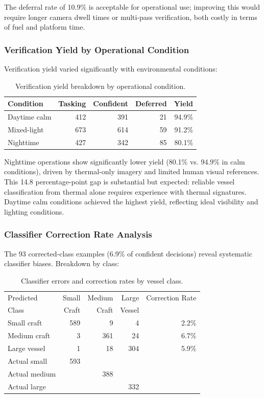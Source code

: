\documentclass[conf]{asmeconf}
\begin{document}
The deferral rate of 10.9\% is acceptable for operational use; improving this would require longer camera dwell times or multi-pass verification, both costly in terms of fuel and platform time.

\subsubsection{Verification Yield by Operational Condition}

Verification yield varied significantly with environmental conditions:

\begin{table}[t]
\caption{Verification yield breakdown by operational condition.}
\label{tab:yield_by_condition}
\centering
\begin{tabular}{@{}lrrrr@{}}
\toprule
Condition & Tasking & Confident & Deferred & Yield \\
\midrule
Daytime calm & 412 & 391 & 21 & 94.9\% \\
Mixed-light & 673 & 614 & 59 & 91.2\% \\
Nighttime & 427 & 342 & 85 & 80.1\% \\
\bottomrule
\end{tabular}
\end{table}

Nighttime operations show significantly lower yield (80.1\% vs. 94.9\% in calm conditions), driven by thermal-only imagery and limited human visual references. This 14.8 percentage-point gap is substantial but expected: reliable vessel classification from thermal alone requires experience with thermal signatures. Daytime calm conditions achieved the highest yield, reflecting ideal visibility and lighting conditions.

\subsubsection{Classifier Correction Rate Analysis}

The 93 corrected-class examples (6.9\% of confident decisions) reveal systematic classifier biases. Breakdown by class:

\begin{table}[t]
\caption{Classifier errors and correction rates by vessel class.}
\label{tab:corrections_by_class}
\centering
\begin{tabular}{@{}lrrrr@{}}
\toprule
Predicted & Small & Medium & Large & Correction Rate \\
Class & Craft & Craft & Vessel & \\
\midrule
Small craft & 589 & 9 & 4 & 2.2\% \\
Medium craft & 3 & 361 & 24 & 6.7\% \\
Large vessel & 1 & 18 & 304 & 5.9\% \\
\midrule
Actual small & 593 & & & \\
Actual medium & & 388 & & \\
Actual large & & & 332 & \\
\end{tabular}
\end{table}
\end{document}
